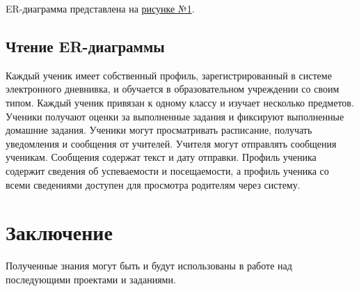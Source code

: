 \documentclass[a4paper, final]{article}
\begin{document}
ER-диаграмма представлена на \hyperlink{diag:er}{рисунке №1}.

\newpage
\hypertarget{diag:er}{}

\addtocounter{figure}{1}
\newpage

\subsection{Чтение ER-диаграммы}
Каждый ученик имеет собственный профиль, зарегистрированный в системе электронного дневнивка, и обучается в образовательном учреждении со своим типом. Каждый ученик привязан к одному классу и изучает несколько предметов. Ученики получают оценки за выполненные задания и фиксируют выполненные домашние задания. Ученики могут просматривать расписание, получать уведомления и сообщения от учителей. Учителя могут отправлять сообщения ученикам. Сообщения содержат текст и дату отправки. Профиль ученика содержит сведения об успеваемости и посещаемости, а профиль ученика со всеми сведениями доступен для просмотра родителям через систему.



\newpage
\section*{Заключение}
Полученные знания могут быть и будут использованы в работе над последующими проектами и заданиями.

\cleardoublepage
{}
\newpage
\begin{thebibliography}{0}
\end{thebibliography}
\end{document}
